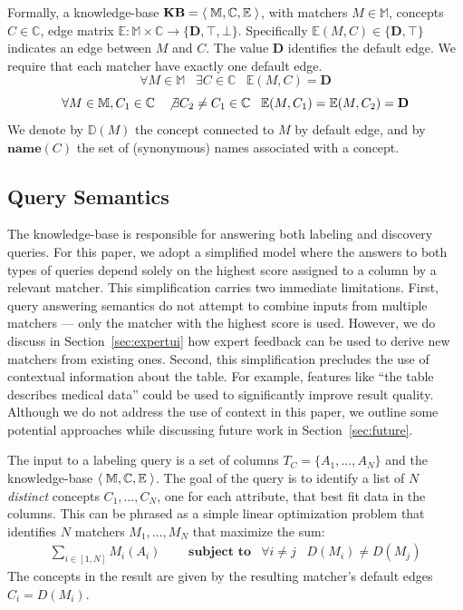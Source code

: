 Formally, a knowledge-base $\textbf{KB} = \left<\;{\mathbb M, \mathbb C, \mathbb E}\;\right>$, with matchers $M \in \mathbb M$, concepts $C \in \mathbb C$, edge matrix $\mathbb E : \mathbb M \times \mathbb C \rightarrow \{\mathbf D, \top, \bot\}$.
Specifically $\mathbb E(M, C) \in \{\mathbf D, \top\}$ indicates an edge between $M$ and $C$.
The value $\mathbf D$ identifies the default edge.
We require that each matcher have exactly one default edge.
$$\forall M \in \mathbb M \;\;\; \exists C \in \mathbb C\;\;\; \mathbb E(M, C) = \mathbf D$$
$$\forall M \in \mathbb M, C_1 \in \mathbb C \;\;\; \not\exists C_2 \neq C_1 \in \mathbb C \;\;\; \mathbb E(M, C_1) = \mathbb E(M, C_2) = \mathbf D$$
We denote by $\mathbb D(M)$ the concept connected to $M$ by default edge, and by $\textbf{name}(C)$ the set of (synonymous) names associated with a concept.




\subsection{Query Semantics}

The \systemname knowledge-base is responsible for answering both labeling and discovery queries.
For this paper, we adopt a simplified model where the answers to both types of queries depend solely on the highest score assigned to a column by a relevant matcher.
This simplification carries two immediate limitations.
First, query answering semantics do not attempt to combine inputs from multiple matchers --- only the matcher with the highest score is used.
However, we do discuss in Section~\ref{sec:expertui} how expert feedback can be used to derive new matchers from existing ones.
Second, this simplification precludes the use of contextual information about the table.
For example, features like ``the table describes medical data'' could be used to significantly improve result quality.
Although we do not address the use of context in this paper, we outline some potential approaches while discussing future work in Section~\ref{sec:future}.

The input to a labeling query is a set of columns $T_C = \{A_1, \ldots, A_N\}$ and the knowledge-base $\left<\;{\mathbb M, \mathbb C, \mathbb E}\;\right>$. 
The goal of the query is to identify a list of $N$ \emph{distinct} concepts $C_1, \ldots, C_N$, one for each attribute, that best fit data in the columns.
This can be phrased as a simple linear optimization problem that identifies $N$ matchers $M_1, \ldots, M_N$ that maximize the sum:
\begin{align*}
\sum_{i \in [1,N]} M_i(A_i) 
&\;\;\;\;\; \textbf{subject to} &
\forall i \neq j \;\;\; D(M_i) \neq D(M_j)
\end{align*}
The concepts in the result are given by the resulting matcher's default edges $C_i = D(M_i)$.

